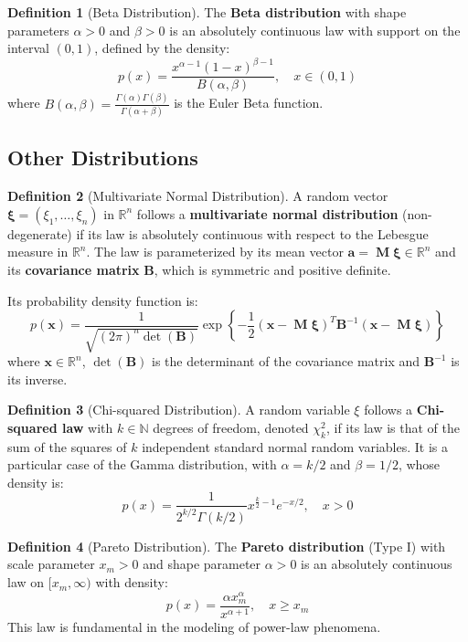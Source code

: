 \documentclass[12pt, openany]{book}
\theoremstyle{definition}
\newtheorem{definition}{Definition}[section]
\theoremstyle{plain}
\theoremstyle{remark}
\newcommand{\R}{\mathbb{R}}
\DeclareMathOperator{\M}{\mathbf{M}} %
\begin{document}
\begin{definition}[Beta Distribution]
The \textbf{Beta distribution} with shape parameters $\alpha > 0$ and $\beta > 0$ is an absolutely continuous law with support on the interval $(0,1)$, defined by the density:
$$ p(x) = \frac{x^{\alpha-1}(1-x)^{\beta-1}}{B(\alpha, \beta)}, \quad x \in (0,1) $$
where $B(\alpha, \beta) = \frac{\Gamma(\alpha)\Gamma(\beta)}{\Gamma(\alpha+\beta)}$ is the Euler Beta function.
\end{definition}

\subsection{Other Distributions}

\begin{definition}[Multivariate Normal Distribution]
A random vector $\boldsymbol{\xi} = (\xi_1, \dots, \xi_n)$ in $\R^n$ follows a \textbf{multivariate normal distribution} (non-degenerate) if its law is absolutely continuous with respect to the Lebesgue measure in $\R^n$. The law is parameterized by its mean vector $\mathbf{a} = \M\boldsymbol{\xi} \in \R^n$ and its \textbf{covariance matrix} $\mathbf{B}$, which is symmetric and positive definite.

Its probability density function is:
$$ p(\mathbf{x}) = \frac{1}{\sqrt{(2\pi)^n \det(\mathbf{B})}} \exp\left\{-\frac{1}{2} (\mathbf{x}-\M\boldsymbol{\xi})^T \mathbf{B}^{-1} (\mathbf{x}-\M\boldsymbol{\xi})\right\} $$
where $\mathbf{x} \in \R^n$, $\det(\mathbf{B})$ is the determinant of the covariance matrix and $\mathbf{B}^{-1}$ is its inverse.
\end{definition}

\begin{definition}[Chi-squared Distribution]
A random variable $\xi$ follows a \textbf{Chi-squared law} with $k \in \mathbb{N}$ degrees of freedom, denoted $\chi^2_k$, if its law is that of the sum of the squares of $k$ independent standard normal random variables. It is a particular case of the Gamma distribution, with $\alpha=k/2$ and $\beta=1/2$, whose density is:
$$ p(x) = \frac{1}{2^{k/2}\Gamma(k/2)} x^{\frac{k}{2}-1} e^{-x/2}, \quad x > 0 $$
\end{definition}

\begin{definition}[Pareto Distribution]
The \textbf{Pareto distribution} (Type I) with scale parameter $x_m > 0$ and shape parameter $\alpha > 0$ is an absolutely continuous law on $[x_m, \infty)$ with density:
$$ p(x) = \frac{\alpha x_m^\alpha}{x^{\alpha+1}}, \quad x \ge x_m $$
This law is fundamental in the modeling of power-law phenomena.
\end{definition}
\end{document}
